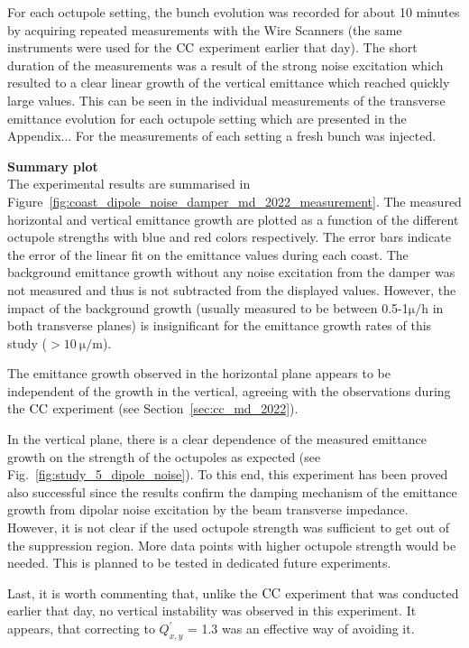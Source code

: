 For each octupole setting, the bunch evolution was recorded for about 10 minutes by acquiring repeated measurements with the Wire Scanners (the same instruments were used for the ${\mathrm{CC}}$ experiment earlier that day). The short duration of the measurements was a result of the strong noise excitation which resulted to a clear linear growth of the vertical emittance which reached quickly large values. This can be seen in the individual measurements of the transverse emittance evolution for each octupole setting which are presented in the Appendix... For the measurements of each setting a fresh bunch was injected. 


\textbf{Summary plot}\\
The experimental results are summarised in Figure~\ref{fig:coast_dipole_noise_damper_md_2022_measurement}. The measured horizontal and vertical emittance growth are plotted as a function of the different octupole strengths with blue and red colors respectively. The error bars indicate the error of the linear fit on the emittance values during each coast. The background emittance growth without any noise excitation from the damper was not measured and thus is not subtracted from the displayed values. However, the impact of the background growth (usually measured to be between 0.5-1$\mathrm{\mu/h}$ in both transverse planes) is insignificant for the emittance growth rates of this study ($ > 10 \ \mathrm{\mu/m}$).
 

The emittance growth observed in the horizontal plane appears to be independent of the growth in the vertical, agreeing with the observations during the ${\mathrm{CC}}$ experiment (see Section~\ref{sec:cc_md_2022}). 

In the vertical plane, there is a clear dependence of the measured emittance growth on the strength of the octupoles as expected (see Fig.~\ref{fig:study_5_dipole_noise}). To this end, this experiment has been proved also successful since the results confirm the damping mechanism of the emittance growth from dipolar noise excitation by the beam transverse impedance. However, it is not clear if the used octupole strength was sufficient to get out of the suppression region. More data points with higher octupole strength would be needed. This is planned to be tested in dedicated future experiments.

Last, it is worth commenting that, unlike the ${\mathrm{CC}}$ experiment that was conducted earlier that day, no vertical instability was observed in this experiment. It appears, that correcting to $Q^\prime_{x,y}$ = 1.3 was an effective way of avoiding it.
  

